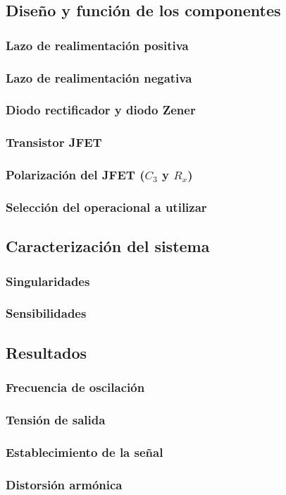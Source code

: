 \subsection{Diseño y función de los componentes}
\subsubsection{Lazo de realimentación positiva}


\subsubsection{Lazo de realimentación negativa}


\subsubsection{Diodo rectificador y diodo Zener}


\subsubsection{Transistor JFET}


\subsubsection{Polarización del JFET ($C_3$ y $R_x$)}


\subsubsection{Selección del operacional a utilizar}



\subsection{Caracterización del sistema}
\subsubsection{Singularidades}


\subsubsection{Sensibilidades}



\subsection{Resultados}
\subsubsection{Frecuencia de oscilación}


\subsubsection{Tensión de salida}


\subsubsection{Establecimiento de la señal}


\subsubsection{Distorsión armónica}
